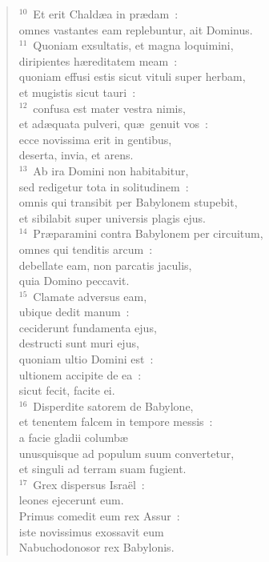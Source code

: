 \begin{verse}
${}^{10}$~Et erit Chald\ae a in pr\ae dam~:\\ omnes vastantes eam replebuntur, ait Dominus.\\
${}^{11}$~Quoniam exsultatis, et magna loquimini,\\ diripientes h\ae reditatem meam~:\\ quoniam effusi estis sicut vituli super herbam,\\ et mugistis sicut tauri~:\\
${}^{12}$~confusa est mater vestra nimis,\\ et ad\ae quata pulveri, qu\ae\ genuit vos~:\\ ecce novissima erit in gentibus,\\ deserta, invia, et arens.\\
${}^{13}$~Ab ira Domini non habitabitur,\\ sed redigetur tota in solitudinem~:\\ omnis qui transibit per Babylonem stupebit,\\ et sibilabit super universis plagis ejus.\\
${}^{14}$~Pr\ae paramini contra Babylonem per circuitum,\\ omnes qui tenditis arcum~:\\ debellate eam, non parcatis jaculis,\\ quia Domino peccavit.\\
${}^{15}$~Clamate adversus eam,\\ ubique dedit manum~:\\ ceciderunt fundamenta ejus,\\ destructi sunt muri ejus,\\ quoniam ultio Domini est~:\\ ultionem accipite de ea~:\\ sicut fecit, facite ei.\\
${}^{16}$~Disperdite satorem de Babylone,\\ et tenentem falcem in tempore messis~:\\ a facie gladii columb\ae \\ unusquisque ad populum suum convertetur,\\ et singuli ad terram suam fugient.\\
${}^{17}$~Grex dispersus Isra\"el~:\\ leones ejecerunt eum.\\ Primus comedit eum rex Assur~:\\ iste novissimus exossavit eum\\ Nabuchodonosor rex Babylonis.\\

\end{verse}
